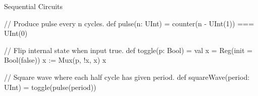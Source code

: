 \documentclass[xcolor=pdflatex,dvipsnames,table]{beamer}
\begin{document}
\begin{frame}[fragile]{Sequential Circuits}

\begin{scala}
// Produce pulse every n cycles.
def pulse(n: UInt) = counter(n - UInt(1)) === UInt(0)
\end{scala}

\begin{scala}
// Flip internal state when input true.
def toggle(p: Bool) = {
  val x = Reg(init = Bool(false))
  x := Mux(p, !x, x)
  x
}
\end{scala}

\begin{scala}
// Square wave where each half cycle has given period.
def squareWave(period: UInt) = toggle(pulse(period))
\end{scala}

\end{frame}
\end{document}
